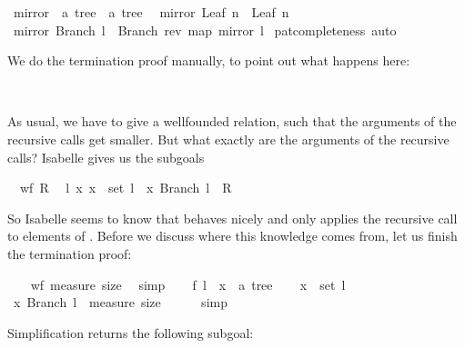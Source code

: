 \begin{isabellebody}
\isamarkuptrue%
\isamarkupfalse%
\ mirror\ {\isacharcolon}{\isacharcolon}\ {\isachardoublequoteopen}{\isacharprime}a\ tree\ {\isasymRightarrow}\ {\isacharprime}a\ tree{\isachardoublequoteclose}\isanewline
{}\isanewline
\ \ {\isachardoublequoteopen}mirror\ {\isacharparenleft}Leaf\ n{\isacharparenright}\ {\isacharequal}\ Leaf\ n{\isachardoublequoteclose}\isanewline
{\isacharbar}\ {\isachardoublequoteopen}mirror\ {\isacharparenleft}Branch\ l{\isacharparenright}\ {\isacharequal}\ Branch\ {\isacharparenleft}rev\ {\isacharparenleft}map\ mirror\ l{\isacharparenright}{\isacharparenright}{\isachardoublequoteclose}\isanewline
%
\isadelimproof
%
\endisadelimproof
%
\isatagproof
{}\isamarkupfalse%
\ pat{\isacharunderscore}completeness\ auto%
\endisatagproof
{\isafoldproof}%
%
\isadelimproof
%
\endisadelimproof
%
\begin{isamarkuptext}%
We do the termination proof manually, to point out what happens
  here:%
\end{isamarkuptext}%
\isamarkuptrue%
\isamarkupfalse%
%
\isadelimproof
\ %
\endisadelimproof
%
\isatagproof
{}\isamarkupfalse%
%
\begin{isamarkuptxt}%
As usual, we have to give a wellfounded relation, such that the
  arguments of the recursive calls get smaller. But what exactly are
  the arguments of the recursive calls? Isabelle gives us the
  subgoals

  \begin{isabelle}%
\ {}{\isachardot}\ wf\ {\isacharquery}R\isanewline
\ {}{\isachardot}\ {\isasymAnd}l\ x{\isachardot}\ x\ {\isasymin}\ set\ l\ {\isasymLongrightarrow}\ {\isacharparenleft}x{\isacharcomma}\ Branch\ l{\isacharparenright}\ {\isasymin}\ {\isacharquery}R%
\end{isabelle} 

  So Isabelle seems to know that  behaves nicely and only
  applies the recursive call  to elements
  of . Before we discuss where this knowledge comes from,
  let us finish the termination proof:%
\end{isamarkuptxt}%
\isamarkuptrue%
\ \ \isamarkupfalse%
\ {\isachardoublequoteopen}wf\ {\isacharparenleft}measure\ size{\isacharparenright}{\isachardoublequoteclose}\ \isamarkupfalse%
\ simp\isanewline
{}\isamarkupfalse%
\isanewline
\ \ \isamarkupfalse%
\ f\ l\ \ x\ {\isacharcolon}{\isacharcolon}\ {\isachardoublequoteopen}{\isacharprime}a\ tree{\isachardoublequoteclose}\isanewline
\ \ \isamarkupfalse%
\ {\isachardoublequoteopen}x\ {\isasymin}\ set\ l{\isachardoublequoteclose}\isanewline
\ \ \isamarkupfalse%
\ {\isachardoublequoteopen}{\isacharparenleft}x{\isacharcomma}\ Branch\ l{\isacharparenright}\ {\isasymin}\ measure\ size{\isachardoublequoteclose}\isanewline
\ \ \ \ \isamarkupfalse%
\ simp%
\begin{isamarkuptxt}%
Simplification returns the following subgoal: 


\end{isamarkuptxt}
\end{isabellebody}
